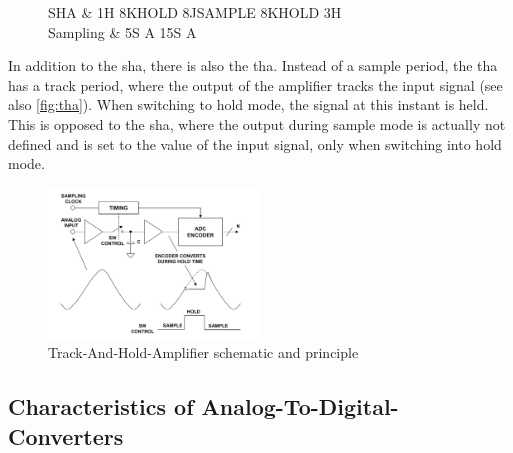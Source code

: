 \begin{figure} [H]
	\centering
	\tikzexternaldisable
	\begin{tikztimingtable}
		[%
		timing/dslope=0.1,
		timing/name/.style={font=\sffamily\normalsize},
		timing/d/text/.style={font=\sffamily\normalsize},
		grayz/.style={timing/z/.append style={gray}},
		timing/n/.style={rectangle},
		timing/metachar={{K}[2]{#1l !{++(0,+.5\yunit)} N[rectangle,scale=.6]{\shortstack{#2}} !{++(0,-.5\yunit)} #1l}},
		timing/metachar={{J}[2]{#1h !{++(0,-.5\yunit)} N[rectangle,scale=.6]{\shortstack{#2}} !{++(0,+.5\yunit)} #1h}},
		]
		SHA & 1H 8K{HOLD} 8J{SAMPLE} 8K{HOLD} 3H\\
		Sampling & 5S A 15S A                    \\
	\end{tikztimingtable}
	\tikzexternalenable
\end{figure}

In addition to the \gls{sha}, there is also the \gls{tha}.
Instead of a sample period, the \gls{tha} has a track period, where the output of the amplifier tracks the input signal (see also \autoref{fig:tha}).
When switching to hold mode, the signal at this instant is held. This is opposed to the \gls{sha}, where the output during sample mode is actually not defined and is set to the value of the input signal, only when switching into hold mode.

\begin{figure}[tbh]
	\centering
	\includegraphics[width = 0.5\textwidth]{chap/02-theory/img/tha}
	\caption{Track-And-Hold-Amplifier schematic and principle \cite{walt}}
	\label{fig:tha}
\end{figure}

\subsection{Characteristics of Analog-To-Digital-Converters}



